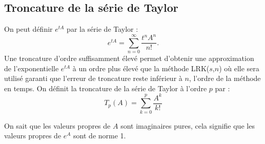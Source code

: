 \subsection{Troncature de la série de Taylor}

On peut définir $e^{tA}$ par la série de Taylor :
$$
  e^{tA} = \sum_{n=0}^\infty \frac{t^nA^n}{n!}.
$$
Une troncature d'ordre suffisamment élevé permet d'obtenir une approximation de l'exponentielle $e^{tA}$ à un ordre plus élevé que la méthode LRK($s$,$n$) où elle sera utilisé garanti que l'erreur de troncature reste inférieur à $n$, l'ordre de la méthode en temps. On définit la troncature de la série de Taylor à l'ordre $p$ par :
$$
  T_p(A) = \sum_{k=0}^p \frac{A^k}{k!}
$$

On sait que les valeurs propres de $A$ sont imaginaires pures, cela signifie que les valeurs propres de $e^{A}$ sont de norme 1.


